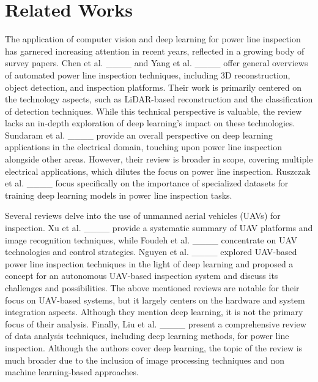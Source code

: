 \section{Related Works}
\label{sec:related_works}
The application of computer vision and deep learning for power line inspection has garnered increasing attention in recent years, reflected in a growing body of survey papers. Chen et al. ____ and Yang et al. ____ offer general overviews of automated power line inspection techniques, including 3D reconstruction, object detection, and inspection platforms. Their work is primarily centered on the technology aspects, such as LiDAR-based reconstruction and the classification of detection techniques. While this technical perspective is valuable, the review lacks an in-depth exploration of deep learning's impact on these technologies. Sundaram et al. ____ provide an overall perspective on deep learning applications in the electrical domain, touching upon power line inspection alongside other areas. However, their review is broader in scope, covering multiple electrical applications, which dilutes the focus on power line inspection. Ruszczak et al. ____ focus specifically on the importance of specialized datasets for training deep learning models in power line inspection tasks. 

Several reviews delve into the use of unmanned aerial vehicles (UAVs) for inspection. Xu et al. ____ provide a systematic summary of UAV platforms and image recognition techniques, while Foudeh et al. ____ concentrate on UAV technologies and control strategies. Nguyen et al. ____ explored UAV-based power line inspection techniques in the light of deep learning and proposed a concept for an autonomous UAV-based inspection system and discuss its challenges and possibilities. The above mentioned reviews are notable for their focus on UAV-based systems, but it largely centers on the hardware and system integration aspects. Although they mention deep learning, it is not the primary focus of their analysis. Finally, Liu et al. ____ present a comprehensive review of data analysis techniques, including deep learning methods, for power line inspection. Although the authors cover deep learning, the topic of the review is much broader due to the inclusion of image processing techniques and non machine learning-based approaches.

